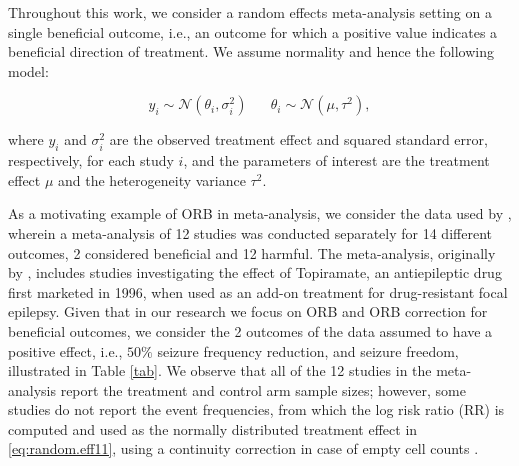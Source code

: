 \documentclass[twocolumn]{article}\usepackage[]{graphicx}\usepackage[]{xcolor}
\begin{document}
Throughout this work, we consider a random effects meta-analysis setting on a single beneficial outcome, i.e., an outcome for which a positive value indicates a beneficial direction of treatment. We assume normality and hence the following model:

\bigskip

\begin{equation}\label{eq:random.eff11}
y_i \sim \mathcal{N}(\theta_i, \sigma_i^2) \; \; \; \; \; \; \theta_i \sim \mathcal{N}(\mu, \tau^2),
\end{equation}

\bigskip

where $y_i$ and $\sigma_i^2$ are the observed treatment effect and squared standard error, respectively, for each study $i$, and the parameters of interest are the treatment effect $\mu$ and the heterogeneity variance $\tau^2$.

As a motivating example of ORB in meta-analysis, we consider the data used by \citet{Copas2019}, wherein a meta-analysis of 12 studies was conducted separately for 14 different outcomes, 2 considered beneficial and 12 harmful. The meta-analysis, originally by \citet{topiramate}, includes studies investigating the effect of Topiramate, an antiepileptic drug first marketed in 1996, when used as an add-on treatment for drug-resistant focal epilepsy. Given that in our research we focus on ORB and ORB correction for beneficial outcomes, we consider the 2 outcomes of the data assumed to have a positive effect, i.e., $50 \%$ seizure frequency reduction, and seizure freedom, illustrated in Table \ref{tab}. We observe that all of the 12 studies in the meta-analysis report the treatment and control arm sample sizes; however, some studies do not report the event frequencies, from which the log risk ratio (RR) is computed and used as the normally distributed treatment effect in \eqref{eq:random.eff11}, using a continuity correction in case of empty cell counts \citep{Copas2019}.
\end{document}
